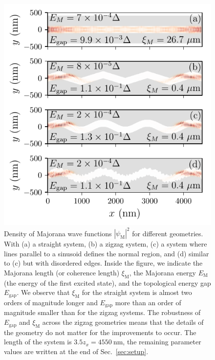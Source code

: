 \documentclass[english, twocolumn, 10pt, aps, superscriptaddress, floatfix, prb, citeautoscript]{revtex4-1}
\begin{document}
\begin{figure}[!htb]
\includegraphics[width=\columnwidth]{figures/wavefunctions}
\caption{Density of Majorana wave functions $\left| \psi_\textrm{M} \right|^2$ for different geometries.
With (a) a straight system, (b) a zigzag system, (c) a system where lines parallel to a sinusoid defines the normal region, and (d) similar to (c) but with disordered edges.
Inside the figure, we indicate the Majorana length (or coherence length) $\xi_\textrm{M}$, the Majorana energy $E_\textrm{M}$ (the energy of the first excited state), and the topological energy gap $E_\textrm{gap}$.
We observe that $\xi_\textrm{M}$ for the straight system is almost two orders of magnitude longer and $E_\textrm{gap}$ more than an order of magnitude smaller than for the zigzag systems.
The robustness of $E_\textrm{gap}$ and $\xi_\textrm{M}$ across the zigzag geometries means that the details of the geometry do not matter for the improvements to occur.
The length of the system is $3.5 z_x=\SI{4550}{\nm}$, the remaining parameter values are written at the end of Sec.~\ref{sec:setup}.\label{fig:wave_functions}}
\end{figure}
\end{document}

